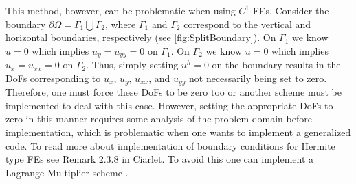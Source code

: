 

This method, however, can be problematic when using $C^1$ FEs. Consider the
boundary $\partial \Omega = \Gamma_1 \bigcup \Gamma_2$, where $\Gamma_1$ and
$\Gamma_2$ correspond to the vertical and horizontal boundaries, respectively
(see \autoref{fig:SplitBoundary}).  On $\Gamma_1$ we know $u=0$ which implies
$u_y = u_{yy} = 0$ on $\Gamma_1$.  On $\Gamma_2$ we know $u=0$ which implies
$u_x = u_{xx} = 0$ on $\Gamma_2$. Thus, simply setting $u^h = 0$ on the boundary
results in the DoFs corresponding to $u_x,\,u_y,\,u_{xx}$, and $u_{yy}$ not
necessarily being set to zero. Therefore, one must force these DoFs to be zero
too or another scheme must be implemented to deal with this case. However,
setting the appropriate DoFs to zero in this manner requires some analysis of
the problem domain before implementation, which is problematic when one wants to
implement a generalized code. To read more about implementation of boundary
conditions for Hermite type FEs see Remark 2.3.8 in Ciarlet\cite{Ciarlet}. To
avoid this one can implement a Lagrange Multiplier scheme
\cite{Babuska1973,Barbosa1991,Barbosa1992,Bramble1981,Pitkaranta1980,Pitkaranta1981}.



